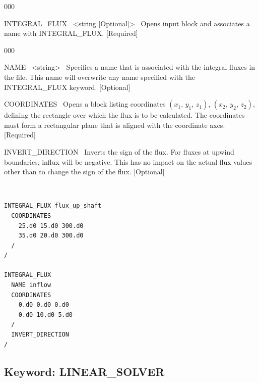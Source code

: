 \begin{deflist}{000}

\item[INTEGRAL\_FLUX] \ <string [Optional]> \ 
Opens input block and associates a name with INTEGRAL\_FLUX. [Required]

\begin{deflist}{000}

\item[NAME] \  <string> \
Specifies a name that is associated with the integral fluxes in the  file. This name will overwrite any name specified with the INTEGRAL\_FLUX keyword. [Optional]

\item[COORDINATES] \ 
Opens a block listing coordinates $(x_1,\, y_1,\, z_1)$, $(x_2,\, y_2,\, z_2)$, defining the rectangle over which the flux is to be calculated. The coordinates must form a rectangular plane that is aligned with the coordinate axes. [Required]

\item[INVERT\_DIRECTION] \ 
Inverts the sign of the flux. For fluxes at upwind boundaries, influx will be negative. This has no impact on the actual flux values other than to change the sign of the flux. [Optional]
\end{deflist}

\item[\keyend] ~
\end{deflist}


\begin{mdframed}

\footnotesize

\begin{verbatim}
INTEGRAL_FLUX flux_up_shaft
  COORDINATES
    25.d0 15.d0 300.d0
    35.d0 20.d0 300.d0
  /
/

INTEGRAL_FLUX
  NAME inflow
  COORDINATES
    0.d0 0.d0 0.d0
    0.d0 10.d0 5.d0
  /
  INVERT_DIRECTION
/
\end{verbatim}
\normalsize
\end{mdframed}

\hyperlink{target_key}{\return}



\newpage

\protect\hypertarget{target_linsolv}{}

\subsection{Keyword: LINEAR\_SOLVER}

